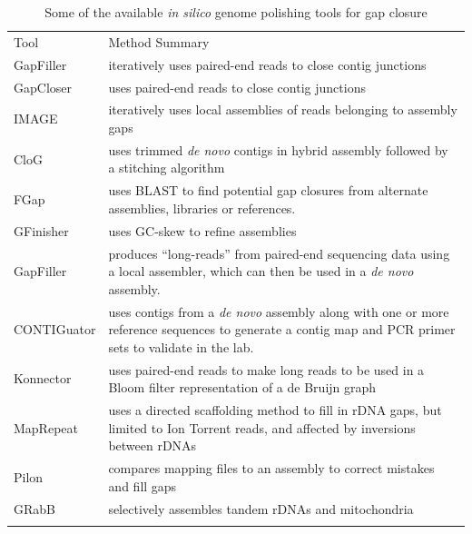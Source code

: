 \documentclass[a4,center,fleqn]{NAR}
\begin{document}
\begin{table}[t]
\centering
\caption{Some of the available \textit{in silico} genome polishing tools for gap closure}
\label{table:tools}
\begin{tabular*}{\textwidth}{p{2.7cm}p{13cm}}
  \toprule
  Tool &  Method Summary \\
  \colrule
  GapFiller\cite{Boetzer2012} & iteratively uses paired-end reads to close contig junctions \\

  GapCloser\cite{Luo2012} & uses paired-end reads to close contig junctions \\

  IMAGE \cite{Tsai2010} & iteratively uses local assemblies of reads belonging to  assembly gaps \\

  CloG \cite{Yang2011} & uses trimmed \textit{de novo} contigs in hybrid assembly followed by a stitching algorithm \\

  FGap \cite{Piro2014,Guizelini2016} & uses BLAST to find potential gap closures from alternate assemblies, libraries or references. \\

  GFinisher \cite{Guizelini2016} & uses GC-skew to refine assemblies \\

  GapFiller \cite{Nadalin2012} &  produces ``long-reads'' from paired-end sequencing data using a local assembler, which can then be used in a \textit{de novo} assembly. \\

  CONTIGuator\cite{Galardini2011} & uses contigs from a \textit{de novo} assembly along with one or more reference sequences to generate a contig map and PCR primer sets to validate in the lab. \\

  Konnector\cite{Vandervalk2015} & uses paired-end reads to make long reads to be used in a Bloom filter representation of a de Bruijn graph \\

  MapRepeat\cite{Mariano2015} & uses a directed scaffolding method to fill in rDNA gaps, but limited to Ion Torrent reads, and affected by inversions between rDNAs \cite{Mariano2016} \\

  Pilon\cite{Walker2014a} & compares mapping files to an assembly to correct mistakes and fill gaps \\
  GRabB\cite{Brankovics2016} & selectively assembles tandem rDNAs and mitochondria\\
  \botrule
\end{tabular*}
\end{table}
\end{document}
